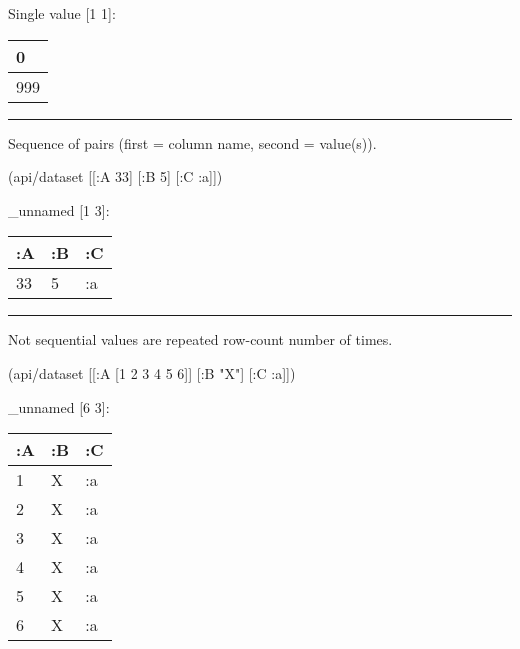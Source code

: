 \documentclass[]{article}
\newenvironment{Shaded}{\begin{snugshade}}{\end{snugshade}}
\newcommand{\DecValTok}[1]{\textcolor[rgb]{0.00,0.00,0.81}{#1}}
\newcommand{\StringTok}[1]{\textcolor[rgb]{0.31,0.60,0.02}{#1}}
\newcommand{\AttributeTok}[1]{\textcolor[rgb]{0.77,0.63,0.00}{#1}}
\newcommand{\NormalTok}[1]{#1}
\begin{document}
Single value {[}1 1{]}:

\begin{longtable}[]{@{}l@{}}
\toprule
0\tabularnewline
\midrule
\endhead
999\tabularnewline
\bottomrule
\end{longtable}

\begin{center}\rule{0.5\linewidth}{0.5pt}\end{center}

Sequence of pairs (first = column name, second = value(s)).

\begin{Shaded}
\begin{Highlighting}[]
\NormalTok{(api/dataset [[}\AttributeTok{:A} \DecValTok{33}\NormalTok{] [}\AttributeTok{:B} \DecValTok{5}\NormalTok{] [}\AttributeTok{:C} \AttributeTok{:a}\NormalTok{]])}
\end{Highlighting}
\end{Shaded}

\_unnamed {[}1 3{]}:

\begin{longtable}[]{@{}lll@{}}
\toprule
:A & :B & :C\tabularnewline
\midrule
\endhead
33 & 5 & :a\tabularnewline
\bottomrule
\end{longtable}

\begin{center}\rule{0.5\linewidth}{0.5pt}\end{center}

Not sequential values are repeated row-count number of times.

\begin{Shaded}
\begin{Highlighting}[]
\NormalTok{(api/dataset [[}\AttributeTok{:A}\NormalTok{ [}\DecValTok{1} \DecValTok{2} \DecValTok{3} \DecValTok{4} \DecValTok{5} \DecValTok{6}\NormalTok{]] [}\AttributeTok{:B} \StringTok{"X"}\NormalTok{] [}\AttributeTok{:C} \AttributeTok{:a}\NormalTok{]])}
\end{Highlighting}
\end{Shaded}

\_unnamed {[}6 3{]}:

\begin{longtable}[]{@{}lll@{}}
\toprule
:A & :B & :C\tabularnewline
\midrule
\endhead
1 & X & :a\tabularnewline
2 & X & :a\tabularnewline
3 & X & :a\tabularnewline
4 & X & :a\tabularnewline
5 & X & :a\tabularnewline
6 & X & :a\tabularnewline
\bottomrule
\end{longtable}
\end{document}
